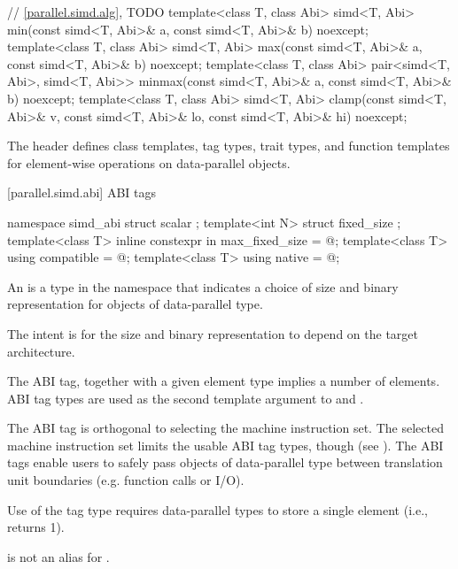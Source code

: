 \begin{codeblock}
{{    // \ref{parallel.simd.alg}, TODO
    template<class T, class Abi>
    simd<T, Abi>
    min(const simd<T, Abi>& a, const simd<T, Abi>& b) noexcept;
    template<class T, class Abi>
    simd<T, Abi>
    max(const simd<T, Abi>& a, const simd<T, Abi>& b) noexcept;
    template<class T, class Abi>
    pair<simd<T, Abi>, simd<T, Abi>>
    minmax(const simd<T, Abi>& a, const simd<T, Abi>& b) noexcept;
    template<class T, class Abi>
    simd<T, Abi>
    clamp(const simd<T, Abi>& v,
    const simd<T, Abi>& lo,
    const simd<T, Abi>& hi) noexcept;
  }
}
\end{codeblock}

\pnum
The header  defines class templates, tag types, trait types, and function templates for element-wise operations on data-parallel objects.

[parallel.simd.abi]{ ABI tags}

\begin{codeblock}
  namespace simd_abi {
    struct scalar {};
    template<int N> struct fixed_size {};
    template<class T> inline constexpr in max_fixed_size = @\impdef@;
    template<class T> using compatible = @\impdef@;
    template<class T> using native = @\impdef@;
  }
\end{codeblock}

\pnum
An  is a type in the  namespace that indicates a choice of size and binary representation for objects of data-parallel type. \begin{note}The intent is for the size and binary representation to depend on the target architecture.\end{note} The ABI tag, together with a given element type implies a number of elements. ABI tag types are used as the second template argument to  and .

\pnum
\begin{note}The ABI tag is orthogonal to selecting the machine instruction set. The selected machine instruction set limits the usable ABI tag types, though (see ). The ABI tags enable users to safely pass objects of data-parallel type between translation unit boundaries (e.g. function calls or I/O).\end{note}

\pnum
Use of the  tag type requires data-parallel types to store a single element (i.e.,  returns 1). \begin{note} is not an alias for .\end{note}

